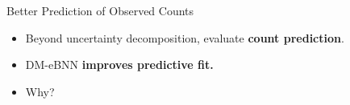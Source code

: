 \begin{frame}{Better Prediction of Observed Counts}
\label{frm:count-prediction}
\begin{itemize}
\item Beyond uncertainty decomposition, evaluate \textbf{count prediction}.
\end{itemize}
\vspace{3mm}
\begin{center}
\small
\setlength{\tabcolsep}{5pt}
\renewcommand{\arraystretch}{1.08}

\end{center}
\vspace{3mm}
\begin{itemize}
\setlength{\itemsep}{3mm}
\item<2-> DM-eBNN \textbf{improves predictive fit.} %
\item<2-> Why?
\end{itemize}
\end{frame}

